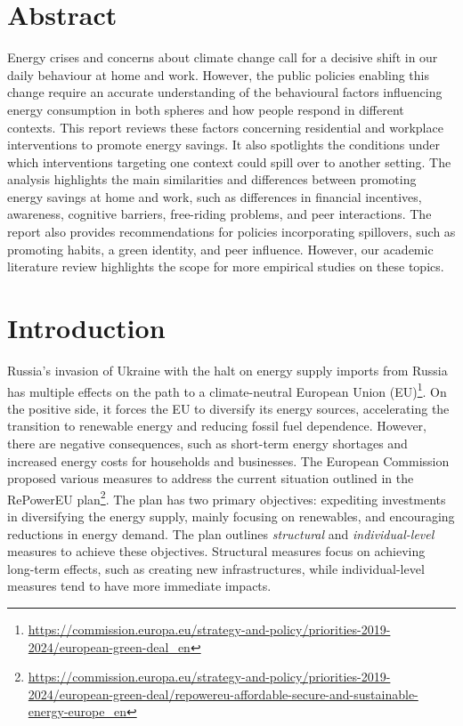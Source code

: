 \documentclass[
  12pt,
  captions=heading]{scrreport}
\DeclareRobustCommand{\href}[2]{#2\footnote{\url{#1}}}
\begin{document}
\clearpage

\hypertarget{abstract}{%
\chapter*{Abstract}\label{abstract}}

Energy crises and concerns about climate change call for a decisive
shift in our daily behaviour at home and work. However, the public
policies enabling this change require an accurate understanding of the
behavioural factors influencing energy consumption in both spheres and
how people respond in different contexts. This report reviews these
factors concerning residential and workplace interventions to promote
energy savings. It also spotlights the conditions under which
interventions targeting one context could spill over to another setting.
The analysis highlights the main similarities and differences between
promoting energy savings at home and work, such as differences in
financial incentives, awareness, cognitive barriers, free-riding
problems, and peer interactions. The report also provides
recommendations for policies incorporating spillovers, such as promoting
habits, a green identity, and peer influence. However, our academic
literature review highlights the scope for more empirical studies on
these topics.

\hypertarget{introduction}{%
\chapter{Introduction}\label{introduction}}

Russia's invasion of Ukraine with the halt on energy supply imports from
Russia has multiple effects on the path
\href{https://commission.europa.eu/strategy-and-policy/priorities-2019-2024/european-green-deal_en}{to
a climate-neutral European Union (EU)}. On the positive side, it forces
the EU to diversify its energy sources, accelerating the transition to
renewable energy and reducing fossil fuel dependence. However, there are
negative consequences, such as short-term energy shortages and increased
energy costs for households and businesses. The European Commission
proposed various measures to address the current situation outlined in
the
\href{https://commission.europa.eu/strategy-and-policy/priorities-2019-2024/european-green-deal/repowereu-affordable-secure-and-sustainable-energy-europe_en}{RePowerEU
plan}. The plan has two primary objectives: expediting investments in
diversifying the energy supply, mainly focusing on renewables, and
encouraging reductions in energy demand. The plan outlines
\emph{structural} and \emph{individual-level} measures to achieve these
objectives. Structural measures focus on achieving long-term effects,
such as creating new infrastructures, while individual-level measures
tend to have more immediate impacts.
\end{document}
